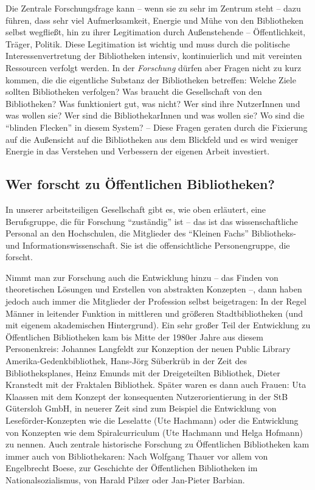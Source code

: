 \documentclass[a4paper,
fontsize=11pt,
oneside,
numbers=noperiodatend,
parskip=half-,
bibliography=totoc,
final
]{scrartcl}
\begin{document}
Die Zentrale Forschungsfrage kann -- wenn sie zu sehr im Zentrum steht
-- dazu führen, dass sehr viel Aufmerksamkeit, Energie und Mühe von den
Bibliotheken selbst wegfließt, hin zu ihrer Legitimation durch
Außenstehende -- Öffentlichkeit, Träger, Politik. Diese Legitimation ist
wichtig und muss durch die politische Interessenvertretung der
Bibliotheken intensiv, kontinuierlich und mit vereinten Ressourcen
verfolgt werden. In der \emph{Forschung} dürfen aber Fragen nicht zu
kurz kommen, die die eigentliche Substanz der Bibliotheken betreffen:
Welche Ziele sollten Bibliotheken verfolgen? Was braucht die
Gesellschaft von den Bibliotheken? Was funktioniert gut, was nicht? Wer
sind ihre NutzerInnen und was wollen sie? Wer sind die BibliothekarInnen
und was wollen sie? Wo sind die \enquote{blinden Flecken} in diesem
System? -- Diese Fragen geraten durch die Fixierung auf die Außensicht
auf die Bibliotheken aus dem Blickfeld und es wird weniger Energie in
das Verstehen und Verbessern der eigenen Arbeit investiert.

\hypertarget{wer-forscht-zu-uxf6ffentlichen-bibliotheken}{%
\subsection{Wer forscht zu Öffentlichen
Bibliotheken?}\label{wer-forscht-zu-uxf6ffentlichen-bibliotheken}}

In unserer arbeitsteiligen Gesellschaft gibt es, wie oben erläutert,
eine Berufsgruppe, die für Forschung \enquote{zuständig} ist -- das ist
das wissenschaftliche Personal an den Hochschulen, die Mitglieder des
\enquote{Kleinen Fachs} Bibliotheks- und Informationswissenschaft. Sie
ist die offensichtliche Personengruppe, die forscht.

Nimmt man zur Forschung auch die Entwicklung hinzu -- das Finden von
theoretischen Lösungen und Erstellen von abstrakten Konzepten --, dann
haben jedoch auch immer die Mitglieder der Profession selbst
beigetragen: In der Regel Männer in leitender Funktion in mittleren und
größeren Stadtbibliotheken (und mit eigenem akademischen Hintergrund).
Ein sehr großer Teil der Entwicklung zu Öffentlichen Bibliotheken kam
bis Mitte der 1980er Jahre aus diesem Personenkreis: Johannes Langfeldt
zur Konzeption der neuen Public Library Amerika-Gedenkbibliothek,
Hans-Jörg Süberkrüb in der Zeit des Bibliotheksplanes, Heinz Emunds mit
der Dreigeteilten Bibliothek, Dieter Kranstedt mit der Fraktalen
Bibliothek. Später waren es dann auch Frauen: Uta Klaassen mit dem
Konzept der konsequenten Nutzerorientierung in der StB Gütersloh GmbH,
in neuerer Zeit sind zum Beispiel die Entwicklung von
Leseförder-Konzepten wie die Leselatte (Ute Hachmann) oder die
Entwicklung von Konzepten wie dem Spiralcurriculum (Ute Hachmann und
Helga Hofmann) zu nennen. Auch zentrale historische Forschung zu
Öffentlichen Bibliotheken kam immer auch von Bibliothekaren: Nach
Wolfgang Thauer vor allem von Engelbrecht Boese, zur Geschichte der
Öffentlichen Bibliotheken im Nationalsozialismus, von Harald Pilzer oder
Jan-Pieter Barbian.
\end{document}
